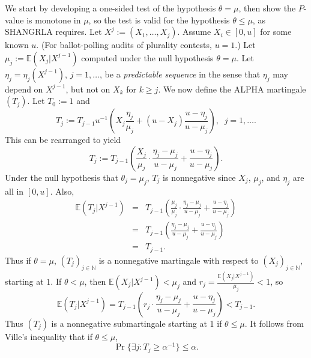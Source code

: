 \documentclass[12pt,runningheads]{llncs}
\newcommand{\EE}{\mathbb{E}}
\begin{document}
{We start by developing a one-sided test of the hypothesis $\theta = \mu$, then show the $P$-value is monotone in
$\mu$, so the test is valid for the hypothesis $\theta \le \mu$, as SHANGRLA requires.
Let $X^j := (X_1, \ldots, X_j)$.
Assume $X_i \in [0, u]$ for some known $u$. 
(For ballot-polling audits of plurality contests, $u=1$.)
Let $\mu_j := \EE(X_j | X^{j-1})$ computed under the null hypothesis $\theta = \mu$. 
Let $\eta_j = \eta_j(X^{j-1})$, $j=1, \ldots$, be a \emph{predictable sequence} in the sense that 
$\eta_j$ may depend on $X^{j-1}$, but not on $X_k$ for $k \ge j$.
We now define the ALPHA martingale $(T_j)$.
Let $T_0 := 1$ and
\begin{equation}
    T_j := T_{j-1} u^{-1}\left ( X_j\frac{\eta_j}{\mu_j} + (u-X_j) \frac{u-\eta_j}{u-\mu_j} \right ), \;\; j=1, \ldots . \label{eq:alphaBRAVOdef}
\end{equation}
This can be rearranged to yield
\begin{equation}
    T_j := T_{j-1} \left ( \frac{X_j}{\mu_j} \cdot \frac{\eta_j-\mu_j}{u-\mu_j} + \frac{u-\eta_j}{u-\mu_j} \right ). \label{eq:alphaMult}
\end{equation}
Under the null hypothesis that $\theta_j = \mu_j$, $T_j$ is nonnegative since $X_j$, $\mu_j$, and $\eta_j$
are all in $[0, u]$.
Also,
\begin{eqnarray}
    \EE (T_j | X^{j-1} ) &=& T_{j-1} \left ( \frac{\mu_j}{\mu_j} \cdot \frac{\eta_j-\mu_j}{u-\mu_j} + \frac{u-\eta_j}{u-\mu_j} \right ) \nonumber \\
    &=&  T_{j-1} \left ( \frac{\eta_j-\mu_j}{u-\mu_j} + \frac{u-\eta_j}{u-\mu_j} \right ) \nonumber \\
    &=& T_{j-1}.
\end{eqnarray}
Thus if $\theta = \mu$, $(T_j)_{j \in \mathbb{N}}$ is a nonnegative martingale with respect to $(X_j)_{j \in \mathbb{N}}$, starting at $1$.
If $\theta < \mu$, then $\EE (X_j | X^{j-1}) < \mu_j$ and $r_j = \frac{\EE (X_j | X^{j-1})}{\mu_j} < 1$, so
\begin{equation}
    \EE (T_j | X^{j-1} ) = T_{j-1} \left ( r_j \cdot \frac{\eta_j-\mu_j}{u-\mu_j} + \frac{u-\eta_j}{u-\mu_j} \right ) < T_{j-1}.
\end{equation}
Thus $(T_j)$ is a nonnegative submartingale starting at 1 if $\theta \le \mu$.
It follows from Ville's inequality \cite{ville39} that if $\theta \le \mu$,
\begin{equation} \label{eq:p-value-adapt}
\Pr \{ \exists j :  T_j \ge \alpha^{-1} \} \le \alpha.
\end{equation}
}
\end{document}
